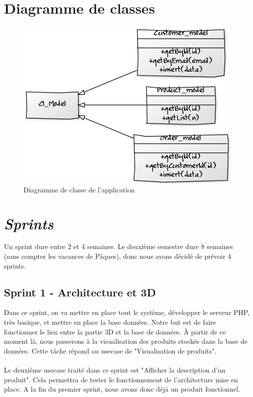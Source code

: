 \documentclass[12pt]{article}
\begin{document}
\section{Diagramme de classes}

\begin{figure}[ht]
    \center
    \includegraphics[scale=0.7]{../Diagrams/ClassDiagrams/Models.png}
    \caption*{Diagramme de classe de l'application}
\end{figure}




\newpage
\section{\textit{Sprints}}
Un sprint dure entre 2 et 4 semaines. Le deuxième semestre dure 8 semaines (sans compter les vacances de Pâques), donc nous avons décidé de prévoir 4 sprints.

\subsection{Sprint 1 - Architecture et 3D}
Dans ce sprint, on va mettre en place tout le système, développer le serveur PHP, très basique, et mettre en place la base données.
Notre but est de faire fonctionner le lien entre la partie 3D et la base de données.
À partir de ce moment là, nous passerons à la visualisation des produits stockés dans la base de données. Cette tâche répond au usecase de "Visualisation de produits".\\\\
Le deuxième usecase traité dans ce sprint est "Afficher la description d'un produit". Cela permettra de tester le fonctionnement de l'architecture mise en place.
A la fin du premier sprint, nous avons donc déjà un produit fonctionnel.
\end{document}
